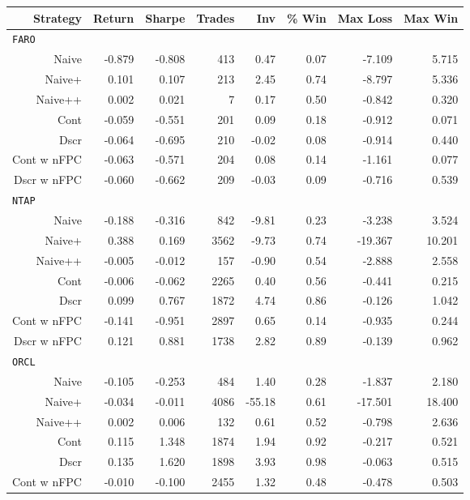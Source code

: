 \begin{table}
\centering
{}
\begin{tabular}{@{} *{8}{r} @{}}
\toprule
Strategy & Return & Sharpe & Trades & Inv & \% Win & Max Loss & Max Win \\
\midrule
\multicolumn{8}{l}{\texttt{FARO}} \\
Naive & -0.879 & -0.808 & 413 & 0.47 & 0.07 & -7.109 & 5.715 \\ 
Naive+ & 0.101 & 0.107 & 213 & 2.45 & 0.74 & -8.797 & 5.336 \\ 
Naive++ & 0.002 & 0.021 & 7 & 0.17 & 0.50 & -0.842 & 0.320 \\ 
Cont & -0.059 & -0.551 & 201 & 0.09 & 0.18 & -0.912 & 0.071 \\ 
Dscr & -0.064 & -0.695 & 210 & -0.02 & 0.08 & -0.914 & 0.440 \\ 
Cont w nFPC & -0.063 & -0.571 & 204 & 0.08 & 0.14 & -1.161 & 0.077 \\ 
Dscr w nFPC & -0.060 & -0.662 & 209 & -0.03 & 0.09 & -0.716 & 0.539 \\[2ex]
\multicolumn{8}{l}{\texttt{NTAP}} \\
Naive & -0.188 & -0.316 & 842 & -9.81 & 0.23 & -3.238 & 3.524 \\ 
Naive+ & 0.388 & 0.169 & 3562 & -9.73 & 0.74 & -19.367 & 10.201 \\ 
Naive++ & -0.005 & -0.012 & 157 & -0.90 & 0.54 & -2.888 & 2.558 \\ 
Cont & -0.006 & -0.062 & 2265 & 0.40 & 0.56 & -0.441 & 0.215 \\ 
Dscr & 0.099 & 0.767 & 1872 & 4.74 & 0.86 & -0.126 & 1.042 \\ 
Cont w nFPC & -0.141 & -0.951 & 2897 & 0.65 & 0.14 & -0.935 & 0.244 \\ 
Dscr w nFPC & 0.121 & 0.881 & 1738 & 2.82 & 0.89 & -0.139 & 0.962 \\[2ex]
\multicolumn{8}{l}{\texttt{ORCL}} \\
Naive & -0.105 & -0.253 & 484 & 1.40 & 0.28 & -1.837 & 2.180 \\ 
Naive+ & -0.034 & -0.011 & 4086 & -55.18 & 0.61 & -17.501 & 18.400 \\ 
Naive++ & 0.002 & 0.006 & 132 & 0.61 & 0.52 & -0.798 & 2.636 \\ 
Cont & 0.115 & 1.348 & 1874 & 1.94 & 0.92 & -0.217 & 0.521 \\ 
Dscr & 0.135 & 1.620 & 1898 & 3.93 & 0.98 & -0.063 & 0.515 \\ 
Cont w nFPC & -0.010 & -0.100 & 2455 & 1.32 & 0.48 & -0.478 & 0.503 \\ 

\end{tabular}
\end{table}
